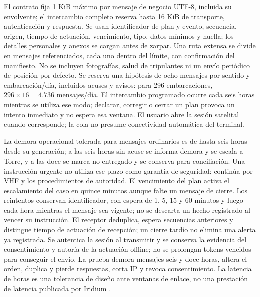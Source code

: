 El contrato fija 1 KiB máximo por mensaje de negocio UTF-8, incluida su envolvente; el intercambio completo reserva hasta 16 KiB de transporte, autenticación y respuesta. Se usan identificador de plan y evento, secuencia, origen, tiempo de actuación, vencimiento, tipo, datos mínimos y huella; los detalles personales y anexos se cargan antes de zarpar. Una ruta extensa se divide en mensajes referenciados, cada uno dentro del límite, con confirmación del manifiesto. No se incluyen fotografías, salud de tripulantes ni un envío periódico de posición por defecto. Se reserva una hipótesis de ocho mensajes por sentido y embarcación/día, incluidos acuses y avisos: para 296 embarcaciones, $296\times16=4.736$ mensajes/día. El intercambio programado ocurre cada seis horas mientras se utiliza ese modo; declarar, corregir o cerrar un plan provoca un intento inmediato y no espera esa ventana. El usuario abre la sesión satelital cuando corresponde; la cola no presume conectividad automática del terminal.

La demora operacional tolerada para mensajes ordinarios es de hasta seis horas desde su generación; a las seis horas sin acuse se informa demora y se escala a Torre, y a las doce se marca no entregado y se conserva para conciliación. Una instrucción urgente no utiliza ese plazo como garantía de seguridad: continúa por VHF y los procedimientos de autoridad. El vencimiento del plan activa el escalamiento del caso en quince minutos aunque falte un mensaje de cierre. Los reintentos conservan identificador, con espera de 1, 5, 15 y 60 minutos y luego cada hora mientras el mensaje sea vigente; no se descarta un hecho registrado al vencer su instrucción. El receptor deduplica, espera secuencias anteriores y distingue tiempo de actuación de recepción; un cierre tardío no elimina una alerta ya registrada. Se autentica la sesión al transmitir y se conserva la evidencia del consentimiento y autoría de la actuación offline; no se prolongan tokens vencidos para conseguir el envío. La prueba demora mensajes seis y doce horas, altera el orden, duplica y pierde respuestas, corta IP y revoca consentimiento. La latencia de horas es una tolerancia de diseño ante ventanas de enlace, no una prestación de latencia publicada por Iridium \parencite[cap.~14, sec.~14.2; cap.~17, sec.~17.2]{caso07}.
